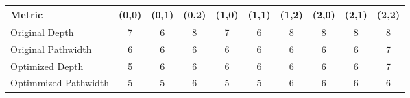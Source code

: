 \documentclass[12pt, twoside, openany]{book}
\begin{document}
\begin{table}[h]
    \centering
    \caption{}
    \label{tab:optimization_data}
    \begin{tabular}{lccccccccc} 
        \toprule
        \textbf{Metric} & \textbf{(0,0)} & \textbf{(0,1)} & \textbf{(0,2)} & \textbf{(1,0)} & \textbf{(1,1)} & \textbf{(1,2)} & \textbf{(2,0)} & \textbf{(2,1)} & \textbf{(2,2)} \\
        \midrule
        Original Depth & 7  & 6  & 8  & 7  & 6  & 8  & 8  & 8  & 8  \\
        Original Pathwidth & 6 & 6 & 6 & 6 & 6 & 6 & 6 & 6 & 7 \\
        Optimized Depth & 5 & 6 & 6 & 6 & 6 & 6 & 6 & 6 & 7 \\
        Optimmized Pathwidth & 5 & 5 & 6 & 5 & 5 & 6 & 6 & 6 & 6 \\
        \bottomrule
    \end{tabular}
\end{table}



\newpage
\printbibliography
\end{document}
